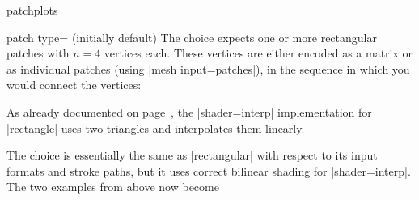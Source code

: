 \begin{pgfplotslibrary}{patchplots}
\begin{pgfplotskey}{patch type= (initially default)}
	The choice  expects one or more rectangular patches with $n=4$ vertices each. These vertices are either encoded as a matrix or as individual patches (using |mesh input=patches|), in the sequence in which you would connect the vertices:
\begin{codeexample}[]
\end{codeexample}
\begin{codeexample}[]
\end{codeexample}
	\noindent As already documented on page~\pageref{key:patch:type}, the |shader=interp| implementation for |rectangle| uses two triangles and interpolates them linearly.

	The choice  is essentially the same as |rectangular| with respect to its input formats and stroke paths, but it uses correct bilinear shading for |shader=interp|. The two examples from above now become
\begin{codeexample}[]
\end{codeexample}
\begin{codeexample}[]
\end{codeexample}


\end{pgfplotskey}
\end{pgfplotslibrary}
